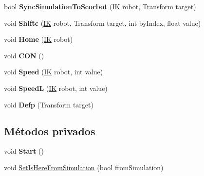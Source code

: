 \begin{DoxyCompactItemize}
\item 
\mbox{\label{class_command_control_aaa99e27c42b07a387f90af03540ba601}} 
bool {\bfseries Sync\+Simulation\+To\+Scorbot} (\mbox{\hyperlink{class_i_k}{IK}} robot, Transform target)
\item 
\mbox{\label{class_command_control_a2de00fee85f608fefc888d987f889af4}} 
void {\bfseries Shiftc} (\mbox{\hyperlink{class_i_k}{IK}} robot, Transform target, int by\+Index, float value)
\item 
\mbox{\label{class_command_control_adae6d4a043a93ded9d51679d78e24ce4}} 
void {\bfseries Home} (\mbox{\hyperlink{class_i_k}{IK}} robot)
\item 
\mbox{\label{class_command_control_a951dd9ecf782547f973c12db75c6f29a}} 
void {\bfseries C\+ON} ()
\item 
\mbox{\label{class_command_control_a7f9634a3a5d21f875edd276f2b06cadb}} 
void {\bfseries Speed} (\mbox{\hyperlink{class_i_k}{IK}} robot, int value)
\item 
\mbox{\label{class_command_control_a05bef86b53aac0d93fea4c255dbe5f86}} 
void {\bfseries SpeedL} (\mbox{\hyperlink{class_i_k}{IK}} robot, int value)
\item 
\mbox{\label{class_command_control_ada99694b0c348a0256faebab0899333b}} 
void {\bfseries Defp} (Transform target)
\end{DoxyCompactItemize}
\subsection*{Métodos privados}
\begin{DoxyCompactItemize}
\item 
\mbox{\label{class_command_control_a2a867f63b6c89f2864cac9d7126614d5}} 
void {\bfseries Start} ()
\item 
void \mbox{\hyperlink{class_command_control_a5b525d701e0c8d6d57e9c7144aa0df44}{Set\+Is\+Here\+From\+Simulation}} (bool from\+Simulation)
\end{DoxyCompactItemize}
